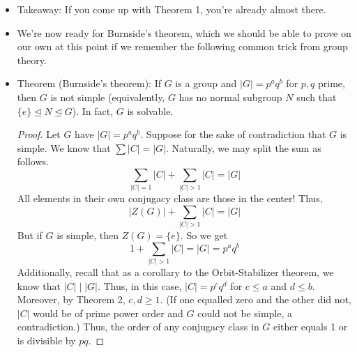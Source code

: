 \documentclass[../notes.tex]{subfiles}
\begin{document}
\begin{itemize}
\begin{proof}
        Let's now use this $V$ such that $p\nmid\dim V$ and $\chi_V(g)\neq 0$. Since $p\nmid\dim V$, $|C|=p^k\nmid\dim V$. Thus, $(|C|,\dim V)=1$. Having proven this fact and $\chi_V(g)\neq 0$ for an \emph{arbitrary} $g\in C$, it follows by Theorem 1 that for all $a\in C$, $\rho_V(a)=\varepsilon\diag(1,\dots,1)=\varepsilon I$\footnote{How do we know it's true for all $a\in G$; couldn't they have different $\varepsilon$ or couldn't we get different $V$'s??}. Thus, if $a_1\neq a_2\in C$, $\rho_V(a_1a_2^{-1})=I$, so $a_1a_2^{-1}\in\ker(\rho_V)$, so the kernel is a normal nontrivial subgroup. The kernel is also not equal to $G$ because elements of it act trivially on $V$, a nontrivial representation, implying the existence of additional $\rho(g)$'s that act nontrivially.
    \end{proof}
    \item Takeaway: If you come up with Theorem 1, you're already almost there.
    \item We're now ready for Burnside's theorem, which we should be able to prove on our own at this point if we remember the following common trick from group theory.
    \item Theorem (Burnside's theorem): If $G$ is a group and $|G|=p^aq^b$ for $p,q$ prime, then $G$ is not simple (equivalently, $G$ has no normal subgroup $N$ such that $\{e\}\trianglelefteq N\trianglelefteq G$). In fact, $G$ is solvable.
    \begin{proof}
        Let $G$ have $|G|=p^aq^b$. Suppose for the sake of contradiction that $G$ is simple. We know that $\sum|C|=|G|$. Naturally, we may split the sum as follows.
        \begin{equation*}
            \sum_{|C|=1}|C|+\sum_{|C|>1}|C| = |G|
        \end{equation*}
        All elements in their own conjugacy class are those in the center! Thus,
        \begin{equation*}
            |Z(G)|+\sum_{|C|>1}|C| = |G|
        \end{equation*}
        But if $G$ is simple, then $Z(G)=\{e\}$. So we get
        \begin{equation*}
            1+\sum_{|C|>1}|C| = |G| = p^aq^b
        \end{equation*}
        Additionally, recall that as a corollary to the Orbit-Stabilizer theorem, we know that $|C|\mid|G|$. Thus, in this case, $|C|=p^cq^d$ for $c\leq a$ and $d\leq b$. Moreover, by Theorem 2, $c,d\geq 1$. (If one equalled zero and the other did not, $|C|$ would be of prime power order and $G$ could not be simple, a contradiction.) Thus, the order of any conjugacy class in $G$ either equals 1 or is divisible by $pq$.\par

\end{proof}
\end{itemize}
\end{document}
